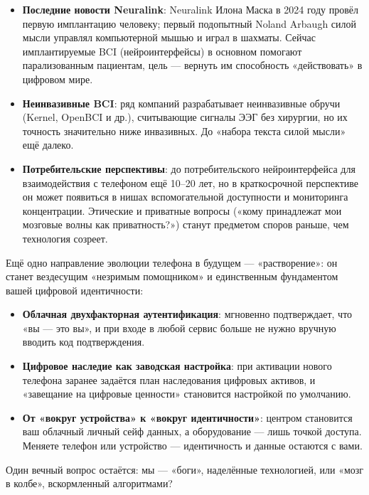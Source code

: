 \begin{itemize}
  \item \textbf{Последние новости Neuralink}: Neuralink Илона Маска в 2024 году провёл первую имплантацию человеку; первый подопытный Noland Arbaugh силой мысли управлял компьютерной мышью и играл в шахматы. Сейчас имплантируемые BCI (нейроинтерфейсы) в основном помогают парализованным пациентам, цель — вернуть им способность «действовать» в цифровом мире.
  \item \textbf{Неинвазивные BCI}: ряд компаний разрабатывает неинвазивные обручи (Kernel, OpenBCI и др.), считывающие сигналы ЭЭГ без хирургии, но их точность значительно ниже инвазивных. До «набора текста силой мысли» ещё далеко.
  \item \textbf{Потребительские перспективы}: до потребительского нейроинтерфейса для взаимодействия с телефоном ещё 10–20 лет, но в краткосрочной перспективе он может появиться в нишах вспомогательной доступности и мониторинга концентрации. Этические и приватные вопросы («кому принадлежат мои мозговые волны как приватность?») станут предметом споров раньше, чем технология созреет.
\end{itemize}


Ещё одно направление эволюции телефона в будущем — «растворение»: он станет вездесущим «незримым помощником» и единственным фундаментом вашей цифровой идентичности:

\begin{itemize}
  \item \textbf{Облачная двухфакторная аутентификация}: мгновенно подтверждает, что «вы — это вы», и при входе в любой сервис больше не нужно вручную вводить код подтверждения.
  \item \textbf{Цифровое наследие как заводская настройка}: при активации нового телефона заранее задаётся план наследования цифровых активов, и «завещание на цифровые ценности» становится настройкой по умолчанию.
  \item \textbf{От «вокруг устройства» к «вокруг идентичности»}: центром становится ваш облачный личный сейф данных, а оборудование — лишь точкой доступа. Меняете телефон или устройство — идентичность и данные остаются с вами.
\end{itemize}


Один вечный вопрос остаётся: мы — «боги», наделённые технологией, или «мозг в колбе», вскормленный алгоритмами?

